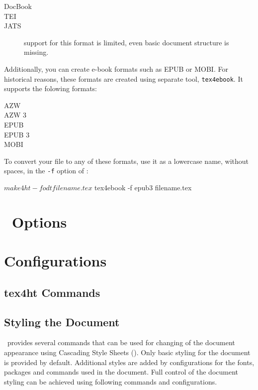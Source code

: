 \documentclass{book}
\begin{document}
\begin{description}
  \item[DocBook]  
  \item[TEI] 
  \item[JATS] support for this format is limited, even basic document structure is missing.
\end{description}

Additionally, you can create e-book formats such as EPUB or MOBI. For historical reasons, these formats
are created using separate tool, \texttt{tex4ebook}. It supports the folowing formats:

\begin{description}
  \item[AZW]
  \item[AZW 3]
  \item[EPUB]
  \item[EPUB 3]
  \item[MOBI]
\end{description}

To convert your file to any of these formats, use it as a lowercase name, without spaces, in the
\texttt{-f} option of \makefourht:

\begin{shellcommand}
$ make4ht -f odt filename.tex
$ tex4ebook -f epub3 filename.tex
\end{shellcommand}



\chapter{\texfourht\ Options}



\chapter{Configurations}

\section{tex4ht Commands}

\section{Styling the Document}

\texfourht\ provides several commands that can be used for changing of the
document appearance using Cascading Style Sheets (\css). Only basic styling for
the document is provided by default. Additional styles are added by configurations for the
fonts, packages and commands used in the document. Full control of the document
styling can be achieved using following commands and configurations.
\end{document}
